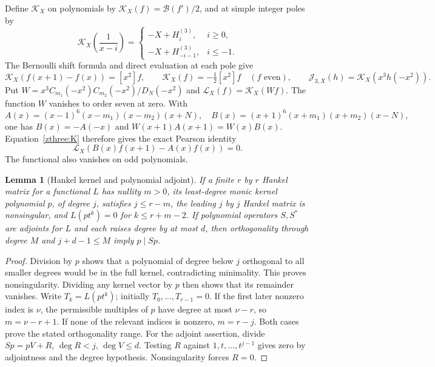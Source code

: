 \documentclass[11pt]{article}
\newtheorem{lemma}[theorem]{Lemma}
\theoremstyle{definition}\newtheorem{definition}[theorem]{Definition}
\theoremstyle{remark}\newtheorem{remark}[theorem]{Remark}
\begin{document}
Define $\mathcal K_X$ on polynomials by
$\mathcal K_X(f)=\mathcal B(f')/2$, and at simple integer poles by
\[
 \mathcal K_X\left(\frac1{x-i}\right)=
 \begin{cases}-X+H_i^{(3)},&i\ge0,\\
 -X+H_{-i-1}^{(3)},&i\le-1.
 \end{cases}
\]
The Bernoulli shift formula and direct evaluation at each pole give
\begin{equation}\label{zthree:K}
 \mathcal K_X(f(x+1)-f(x))=[x^2]f,\qquad
 \mathcal K_X(f)=-\tfrac12[x^2]f\quad(f\text{ even}),\qquad
 \mathcal J_{3,X}(h)=\mathcal K_X(x^3h(-x^2)).
\end{equation}
Put $W=x^3C_{m_1}(-x^2)C_{m_2}(-x^2)/D_N(-x^2)$ and
$\mathcal L_X(f)=\mathcal K_X(Wf)$. The function $W$ vanishes to
order seven at zero. With
\[
 A(x)=(x-1)^6(x-m_1)(x-m_2)(x+N),\quad
 B(x)=(x+1)^6(x+m_1)(x+m_2)(x-N),
\]
one has $B(x)=-A(-x)$ and $W(x+1)A(x+1)=W(x)B(x)$.
Equation~\eqref{zthree:K} therefore gives the exact Pearson identity
\begin{equation}\label{zthree:pearson}
 \mathcal L_X(B(x)f(x+1)-A(x)f(x))=0.
\end{equation}
The functional also vanishes on odd polynomials.

\begin{lemma}[Hankel kernel and polynomial adjoint]\label{zthree:kernel}
If a finite $r$ by $r$ Hankel matrix for a functional $L$ has nullity
$m>0$, its least-degree monic kernel polynomial $p$, of degree $j$,
satisfies $j\le r-m$, the leading $j$ by $j$ Hankel matrix is
nonsingular, and $L(pt^k)=0$ for $k\le r+m-2$.
If polynomial operators $S,S^*$ are adjoints for $L$ and each raises
degree by at most $d$, then orthogonality through degree $M$ and
$j+d-1\le M$ imply $p\mid Sp$.
\end{lemma}
\begin{proof}
Division by $p$ shows that a polynomial of degree below $j$
orthogonal to all smaller degrees would be in the full kernel,
contradicting minimality. This proves nonsingularity. Dividing any
kernel vector by $p$ then shows that its remainder vanishes.
Write $T_k=L(pt^k)$; initially $T_0,\ldots,T_{r-1}=0$.
If the first later nonzero index is $\nu$, the permissible multiples
of $p$ have degree at most $\nu-r$, so $m=\nu-r+1$.
If none of the relevant indices is nonzero, $m=r-j$.
Both cases prove the stated orthogonality range.
For the adjoint assertion, divide $Sp=pV+R$, $\deg R<j$,
$\deg V\le d$. Testing $R$ against $1,t,\ldots,t^{j-1}$ gives
zero by adjointness and the degree hypothesis. Nonsingularity forces
$R=0$.
\end{proof}
\end{document}
